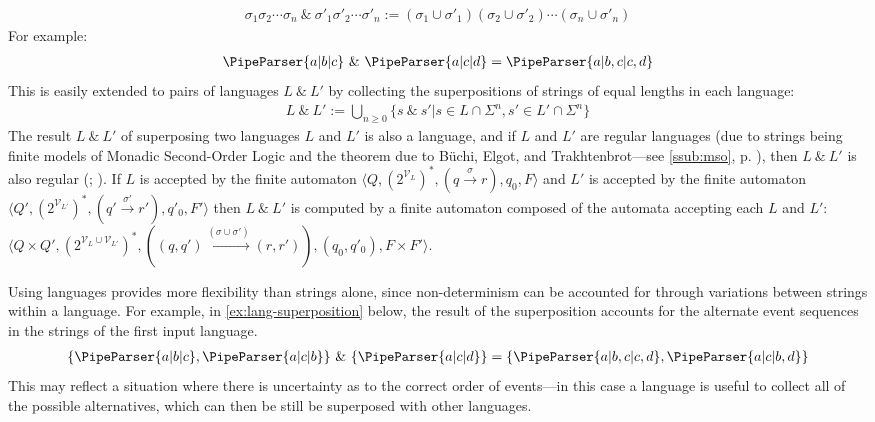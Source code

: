 \documentclass[a4paper,12pt,leqno]{article}
\newcommand{\vph}[1]{\vphantom{#1}}
\newcommand{\sta}[2]{\stackrel{#1}{#2}}
\newcommand{\ebox}[1]{\fbox{$\vph{'(),}#1$}}
\renewcommand{\sp}{~\&~}
\newcommand{\V}{\mathcal{V}}
\newcommand{\EventString}[1]{%
	\renewcommand*{\do}[1]{\ebox{##1}}%
	\PipeParser{#1}%
}
\newcommand{\selfnote}[1]{{\color{red}[NB\footnote{{\color{red}#1}}]}}
\newcommand{\nb}{\selfnote}
\begin{document}
\begin{align}\label{def:superposition}
	\sigma_1\sigma_2\cdots\sigma_n \sp \sigma'_1\sigma'_2\cdots\sigma'_n := (\sigma_1 \cup \sigma'_1)(\sigma_2 \cup \sigma'_2)\cdots(\sigma_n \cup \sigma'_n)
\end{align}
For example:
\begin{align}\label{ex:superposition}
	\EventString{a|b|c} \sp{} \EventString{a|c|d} = \EventString{a|b,c|c,d}
\end{align}
This is easily extended to pairs of languages $L \sp L'$ by collecting the superpositions of strings of equal lengths in each language:
\begin{align}\label{def:lang-superposition}
	L \sp L' := \bigcup_{n \ge 0}\{ s \sp s' | s \in L \cap \Sigma^n, s' \in L' \cap \Sigma^n\}
\end{align}
The result $L \sp L'$ of superposing two languages $L$ and $L'$ is also a language, and if $L$ and $L'$ are regular languages (due to strings being finite models of Monadic Second-Order Logic and the theorem due to B\"uchi, Elgot, and Trakhtenbrot---see \cref{ssub:mso}, p. \pageref{def:mso-regularity}), then $L \sp L'$ is also regular (\citealp{Fernando2004}; \citealp[p. 126]{woods2017towards}). If $L$ is accepted by the finite automaton $\langle Q, (2^{\V_{L}})^*, (q \sta{\sigma}{\to} r), q_0, F \rangle$ and $L'$ is accepted by the finite automaton $\langle Q', (2^{\V_{L'}})^*, (q' \sta{\sigma'}{\to} r'), q'_0, F' \rangle$ then $L \sp L'$ is computed by a finite automaton composed of the automata accepting each $L$ and $L'$: $\langle Q \times Q', (2^{\V_L \cup \V_{L'}})^*, ((q, q') \sta{(\sigma \cup \sigma')}{\to} (r, r')), (q_0, q'_0), F \times F' \rangle$.%

Using languages provides more flexibility than strings alone, since non-determinism can be accounted for through variations between strings within a language. For example, in \cref{ex:lang-superposition} below, the result of the superposition accounts for the alternate event sequences in the strings of the first input language.
\begin{align}\label{ex:lang-superposition}
	\{\EventString{a|b|c}, \EventString{a|c|b}\} \sp \{\EventString{a|c|d}\} = \{\EventString{a|b,c|c,d}, \EventString{a|c|b,d}\}
\end{align}
This may reflect a situation where there is uncertainty as to the correct order of events---in this case a language is useful to collect all of the possible alternatives, which can then be still be superposed with other languages. 
\end{document}
